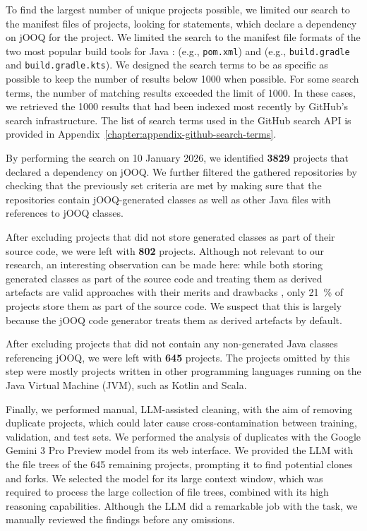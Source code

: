 To find the largest number of unique projects possible, we limited our search to the manifest files of projects, looking for statements, which declare a dependency on jOOQ for the project. We limited the search to the manifest file formats of the two most popular build tools for Java :  (e.g., \texttt{pom.xml}) and  (e.g., \texttt{build.gradle} and \texttt{build.gradle.kts}). We designed the search terms to be as specific as possible to keep the number of results below \num{1000} when possible. For some search terms, the number of matching results exceeded the limit of \num{1000}. In these cases, we retrieved the \num{1000} results that had been indexed most recently by GitHub’s search infrastructure. The list of search terms used in the GitHub search API is provided in Appendix~\ref{chapter:appendix-github-search-terms}.

By performing the search on 10 January 2026, we identified \textbf{\num{3829}} projects that declared a dependency on jOOQ. We further filtered the gathered repositories by checking that the previously set criteria are met by making sure that the repositories contain jOOQ-generated classes as well as other Java files with references to jOOQ classes.

After excluding projects that did not store generated classes as part of their source code, we were left with \textbf{\num{802}} projects. Although not relevant to our research, an interesting observation can be made here: while both storing generated classes as part of the source code and treating them as derived artefacts are valid approaches with their merits and drawbacks , only \qty{21}{\percent} of projects store them as part of the source code. We suspect that this is largely because the jOOQ code generator treats them as derived artefacts by default.

After excluding projects that did not contain any non-generated Java classes referencing jOOQ, we were left with \textbf{\num{645}} projects. The projects omitted by this step were mostly projects written in other programming languages running on the Java Virtual Machine (JVM), such as Kotlin and Scala.

Finally, we performed manual, LLM-assisted cleaning, with the aim of removing duplicate projects, which could later cause cross-contamination between training, validation, and test sets. We performed the analysis of duplicates with the Google Gemini 3 Pro Preview  model from its web interface. We provided the LLM with the file trees of the \num{645} remaining projects, prompting it to find potential clones and forks. We selected the model for its large context window, which was required to process the large collection of file trees, combined with its high reasoning capabilities. Although the LLM did a remarkable job with the task, we manually reviewed the findings before any omissions.

